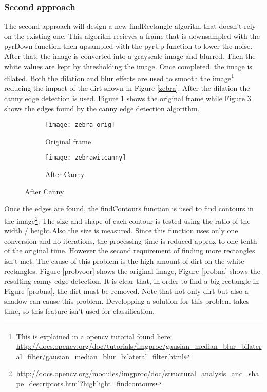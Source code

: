 \subsubsection{Second approach}
The second approach will design a new findRectangle algoritm that doesn't rely on the existing one. This algoritm recieves a frame that is downsampled with the pyrDown function then upsampled with the pyrUp function to lower the noise. After that, the image is converted into a grayscale image and blurred. Then the white values are kept by thresholding the image. Once completed, the image is dilated. Both the dilation and blur effects are used to smooth the image\footnote{This is explained in a opencv tutorial found here: \url{http://docs.opencv.org/doc/tutorials/imgproc/gausian_median_blur_bilateral_filter/gausian_median_blur_bilateral_filter.html}} reducing the impact of the dirt shown in Figure \ref{zebra}. After the dilation the canny edge detection is used. Figure \ref{zebra_orig} shows the original frame while Figure \ref{zebrawitcanny} shows the edges found by the canny edge detection algorithm.
\begin{figure}[ht]
\centering
\caption{Comparison of a frame before and after the canny edge detection.}
\begin{subfigure}{.5\textwidth}
  \centering
  \texttt{[image: zebra\_orig]}
  \caption{Original frame\label{zebra_orig}}
\end{subfigure}%
\begin{subfigure}{.5\textwidth}
  \centering
  \texttt{[image: zebrawitcanny]}
  \caption{After Canny\label{zebrawitcanny}}
\end{subfigure}
\end{figure}
\npar
Once the edges are found, the findContours function is used to find contours in the image\footnote{\url{http://docs.opencv.org/modules/imgproc/doc/structural_analysis_and_shape_descriptors.html?highlight=findcontours}}. The size and shape of each contour is tested using the ratio of the width / height.Also the size is measured. Since this function uses only one conversion and no iterations, the processing time is reduced approx to one-tenth of the original time.
\clearpage
However the second requirement of finding more rectangles isn't met. The cause of this problem is the high amount of dirt
on the white rectangles. Figure \ref{probvoor} shows the original image, Figure \ref{probna} shows the resulting canny
edge detection. It is clear that, in order to find a big rectangle in Figure \ref{probna}, the dirt must be removed. Note that not only dirt but also a shadow can cause this problem. Developping a solution for this problem takes time, so this feature isn't used for classification.
